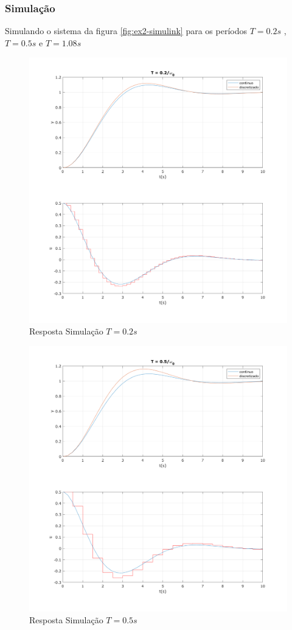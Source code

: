 \documentclass[a4paper,11pt]{article}
\begin{document}
\subsubsection{Simulação}

Simulando o sistema da figura \ref{fig:ex2-simulink} para os períodos $T=0.2s$ , $T=0.5s$ e $T=1.08s$ 

\begin{figure}[H]
    \centering
    \includegraphics[width=0.8\linewidth]{img/exsim2-plot-sim-t02.png}
    \caption{Resposta Simulação $T=0.2s$}
\end{figure}

\begin{figure}[H]
    \centering
    \includegraphics[width=0.8\linewidth]{img/exsim2-plot-sim-t05.png}
    \caption{Resposta Simulação $T=0.5s$}
\end{figure}
\end{document}
